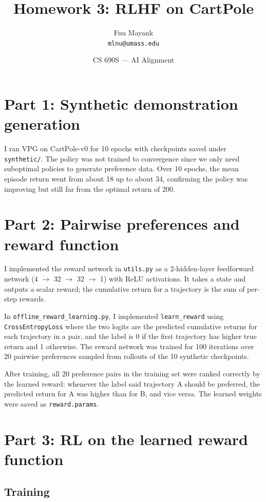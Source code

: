 \documentclass[11pt]{article}
\title{Homework 3: RLHF on CartPole}
\author{Fnu Mayank\\\texttt{mlnu@umass.edu}}
\date{CS 690S --- AI Alignment}
\begin{document}
\maketitle

\section*{Part 1: Synthetic demonstration generation}

I ran VPG on CartPole-v0 for 10 epochs with checkpoints saved under \texttt{synthetic/}. The policy was not trained to convergence since we only need suboptimal policies to generate preference data. Over 10 epochs, the mean episode return went from about 18 up to about 34, confirming the policy was improving but still far from the optimal return of 200.

\section*{Part 2: Pairwise preferences and reward function}

I implemented the reward network in \texttt{utils.py} as a 2-hidden-layer feedforward network (4 $\rightarrow$ 32 $\rightarrow$ 32 $\rightarrow$ 1) with ReLU activations. It takes a state and outputs a scalar reward; the cumulative return for a trajectory is the sum of per-step rewards.

In \texttt{offline\_reward\_learning.py}, I implemented \texttt{learn\_reward} using \texttt{CrossEntropyLoss} where the two logits are the predicted cumulative returns for each trajectory in a pair, and the label is 0 if the first trajectory has higher true return and 1 otherwise. The reward network was trained for 100 iterations over 20 pairwise preferences sampled from rollouts of the 10 synthetic checkpoints.

After training, all 20 preference pairs in the training set were ranked correctly by the learned reward: whenever the label said trajectory A should be preferred, the predicted return for A was higher than for B, and vice versa. The learned weights were saved as \texttt{reward.params}.

\section*{Part 3: RL on the learned reward function}

\subsection*{Training}
\end{document}
